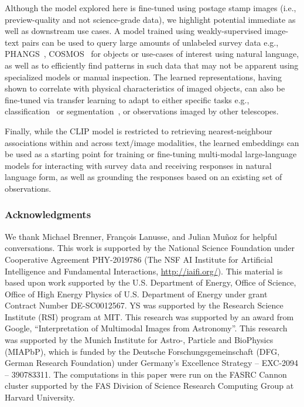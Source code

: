 \documentclass{article} %
\begin{document}
   Although the model explored here is fine-tuned using postage stamp images (i.e., preview-quality and not science-grade data), we highlight potential immediate as well as downstream use cases.
   A model trained using weakly-supervised image-text pairs can be used to query large amounts of unlabeled survey data e.g., PHANGS~\citep{lee2022phangs}, COSMOS~\citep{scoville2007cosmic} for objects or use-cases of interest using natural language, as well as to efficiently find patterns in such data that may not be apparent using specialized models or manual inspection.
   The learned representations, having shown to correlate with physical characteristics of imaged objects, can also be fine-tuned via transfer learning to adapt to either specific tasks e.g., classification~\citep{wei2020deep} or segmentation~\citep{hausen2020morpheus}, or observations imaged by other telescopes.
   
   Finally, while the CLIP model is restricted to retrieving nearest-neighbour associations within and across text/image modalities, the learned embeddings can be used as a starting point for training or fine-tuning multi-modal large-language models for interacting with survey data and receiving responses in natural language form, as well as grounding the responses based on an existing set of observations.
   


\subsubsection*{Acknowledgments}

We thank Michael Brenner, Fran\c{c}ois Lanusse, and Julian Mu\~{n}oz for helpful conversations.
%
This work is supported by the National Science Foundation under Cooperative Agreement PHY-2019786 (The NSF AI Institute for Artificial Intelligence and Fundamental Interactions, \url{http://iaifi.org/}).
%
This material is based upon work supported by the U.S. Department of Energy, Office of Science, Office of High Energy Physics of U.S. Department of Energy under grant Contract Number  DE-SC0012567. 
%
YS was supported by the Research Science Institute (RSI) program at MIT.
%
This research was supported by an award from Google,  ``Interpretation of Multimodal Images from Astronomy''.
%
This research was supported by the Munich Institute for Astro-, Particle and BioPhysics (MIAPbP), which is funded by the Deutsche Forschungsgemeinschaft (DFG, German Research Foundation) under Germany's Excellence Strategy – EXC-2094 – 390783311.
%
The computations in this paper were run on the FASRC Cannon cluster supported by the FAS Division of Science Research Computing Group at Harvard University.
\end{document}
